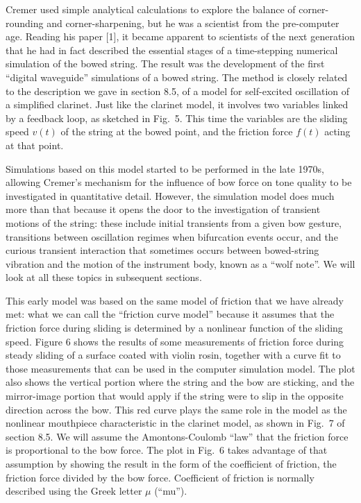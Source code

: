   Cremer used simple analytical calculations to explore the balance of 
  corner-rounding and corner-sharpening, but he was a scientist from the 
  pre-computer age. Reading his paper [1], it became apparent to scientists of 
  the next generation that he had in fact described the essential stages of a 
  time-stepping numerical simulation of the bowed string. The result was the 
  development of the first “digital waveguide” simulations of a bowed string. 
  The method is closely related to the description we gave in section 8.5, of a 
  model for self-excited oscillation of a simplified clarinet. Just like the 
  clarinet model, it involves two variables linked by a feedback loop, as 
  sketched in Fig.\ 5. This time the variables are the sliding speed $v(t)$ of 
  the string at the bowed point, and the friction force $f(t)$ acting at that 
  point. 

  Simulations based on this model started to be performed in the late 1970s, 
  allowing Cremer’s mechanism for the influence of bow force on tone quality to 
  be investigated in quantitative detail. However, the simulation model does 
  much more than that because it opens the door to the investigation of 
  transient motions of the string: these include initial transients from a 
  given bow gesture, transitions between oscillation regimes when bifurcation 
  events occur, and the curious transient interaction that sometimes occurs 
  between bowed-string vibration and the motion of the instrument body, known 
  as a “wolf note”. We will look at all these topics in subsequent sections. 

  This early model was based on the same model of friction that we have already 
  met: what we can call the ``friction curve model'' because it assumes that 
  the friction force during sliding is determined by a nonlinear function of 
  the sliding speed. Figure 6 shows the results of some measurements of 
  friction force during steady sliding of a surface coated with violin rosin, 
  together with a curve fit to those measurements that can be used in the 
  computer simulation model. The plot also shows the vertical portion where the 
  string and the bow are sticking, and the mirror-image portion that would 
  apply if the string were to slip in the opposite direction across the bow. 
  This red curve plays the same role in the model as the nonlinear mouthpiece 
  characteristic in the clarinet model, as shown in Fig.\ 7 of section 8.5. We 
  will assume the Amontons-Coulomb ``law'' that the friction force is 
  proportional to the bow force. The plot in Fig.\ 6 takes advantage of that 
  assumption by showing the result in the form of the coefficient of friction, 
  the friction force divided by the bow force. Coefficient of friction is 
  normally described using the Greek letter $\mu$ (``mu''). 

